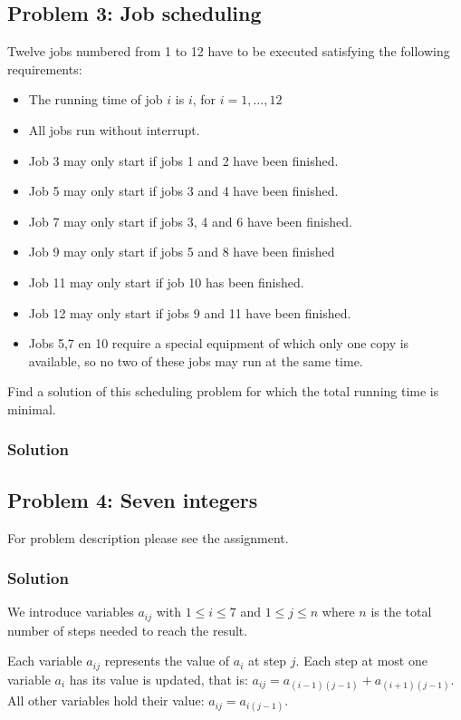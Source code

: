 \documentclass[12pt]{article}
\begin{document}
\subsection*{Problem 3: Job scheduling}
Twelve jobs numbered from 1 to 12 have to be executed satisfying the following
requirements:
\begin{itemize}
	\item The running time of job $i$ is $i$, for $i=1,\ldots,12$
	\item All jobs run without interrupt.
	\item Job 3 may only start if jobs 1 and 2 have been finished.
	\item Job 5 may only start if jobs 3 and 4 have been finished.
	\item Job 7 may only start if jobs 3, 4 and 6 have been finished.
	\item Job 9 may only start if jobs 5 and 8 have been finished
	\item Job 11 may only start if job 10 has been finished.
	\item Job 12 may only start if jobs 9 and 11 have been finished.
	\item Jobs 5,7 en 10 require a special equipment of which only one copy
		is available, so no two of these jobs may run at the same time.
\end{itemize}

Find a solution of this scheduling problem for which the total running time is
minimal.

\subsubsection*{Solution}




\subsection*{Problem 4: Seven integers}

For problem description please see the assignment.

\subsubsection*{Solution}
We introduce variables $a_{ij}$ with $1\leq i \leq 7$ and $1 \leq j \leq n$ 
where $n$ is the total number of steps needed to reach the result.

Each
variable $a_{ij}$ represents the value of $a_i$ at step $j$. Each step at
most one variable $a_i$ has its value is updated, that is: 
$a_{ij} = a_{(i-1)(j-1)}+ a_{(i+1)(j-1)}$. All other variables hold their value:
$a_{ij} = a_{i(j-1)}$.
\end{document}
